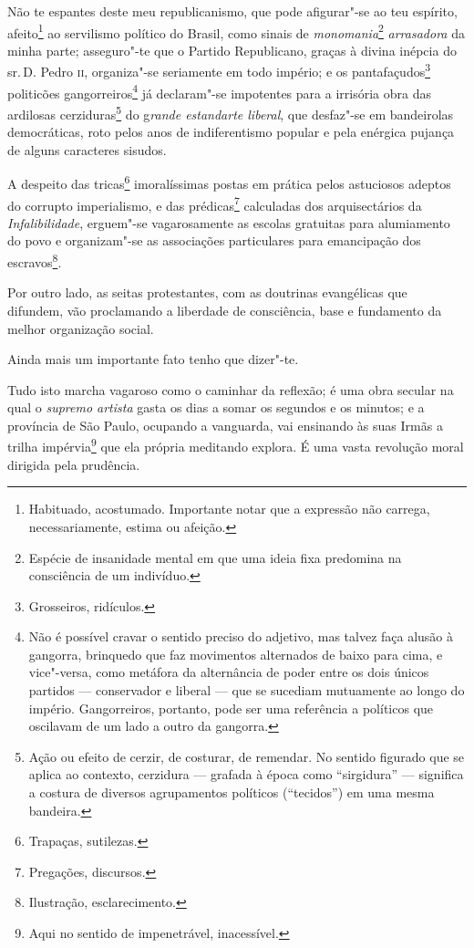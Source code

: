 Não te espantes deste meu republicanismo, que pode afigurar"-se ao teu
espírito, afeito\footnote{Habituado, acostumado. Importante notar que
  a expressão não carrega, necessariamente, estima ou afeição.} ao
servilismo político do Brasil, como sinais de \emph{monomania}\footnote{
  Espécie de insanidade mental em que uma ideia fixa predomina na
  consciência de um indivíduo.} \emph{arrasadora} da minha parte;
asseguro"-te que o Partido Republicano, graças à divina inépcia do sr.\,D.
Pedro \textsc{ii}, organiza"-se seriamente em todo império; e os
pantafaçudos\footnote{Grosseiros, ridículos.} politicões
gangorreiros\footnote{Não é possível cravar o sentido preciso do
  adjetivo, mas talvez faça alusão à gangorra, brinquedo que faz
  movimentos alternados de baixo para cima, e vice"-versa, como metáfora
  da alternância de poder entre os dois únicos partidos --- conservador
  e liberal --- que se sucediam mutuamente ao longo do império.
  Gangorreiros, portanto, pode ser uma referência a políticos que
  oscilavam de um lado a outro da gangorra.} já declaram"-se impotentes
para a irrisória obra das ardilosas cerziduras\footnote{Ação ou efeito
  de cerzir, de costurar, de remendar. No sentido figurado que se aplica
  ao contexto, cerzidura --- grafada à época como ``sirgidura'' ---
  significa a costura de diversos agrupamentos políticos (``tecidos'') em
  uma mesma bandeira.} do g\emph{rande estandarte liberal}, que
desfaz"-se em bandeirolas democráticas, roto pelos anos de indiferentismo
popular e pela enérgica pujança de alguns caracteres sisudos.

A despeito das tricas\footnote{Trapaças, sutilezas.} imoralíssimas
postas em prática pelos astuciosos adeptos do corrupto imperialismo, e
das prédicas\footnote{Pregações, discursos.} calculadas dos
arquisectários da \emph{Infalibilidade}, erguem"-se vagarosamente as
escolas gratuitas para alumiamento do povo e organizam"-se as associações
particulares para emancipação dos escravos\footnote{Ilustração,
  esclarecimento.}.

Por outro lado, as seitas protestantes, com as doutrinas evangélicas que
difundem, vão proclamando a liberdade de consciência, base e fundamento
da melhor organização social.

Ainda mais um importante fato tenho que dizer"-te.

Tudo isto marcha vagaroso como o caminhar da reflexão; é uma obra
secular na qual o \emph{supremo artista} gasta os dias a somar os
segundos e os minutos; e a província de São Paulo, ocupando a vanguarda,
vai ensinando às suas Irmãs a trilha impérvia\footnote{Aqui no sentido
  de impenetrável, inacessível.} que ela própria meditando explora. É
uma vasta revolução moral dirigida pela prudência.

